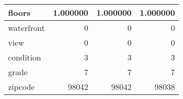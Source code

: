 \begin{table}[H]
\begin{tabular}{|l|r|r|r|}
\hline floors & \cellcolor[rgb]{0.9, 0.54, 0.52} 1.000000 & \cellcolor[rgb]{0.9, 0.54, 0.52} 1.000000 & \cellcolor[rgb]{0.9, 0.54, 0.52} 1.000000 \\
\hline waterfront & \cellcolor[rgb]{0.9, 0.54, 0.52} 0 & \cellcolor[rgb]{0.9, 0.54, 0.52} 0 & \cellcolor[rgb]{0.9, 0.54, 0.52} 0 \\
\hline view & \cellcolor[rgb]{0.9, 0.54, 0.52} 0 & \cellcolor[rgb]{0.9, 0.54, 0.52} 0 & \cellcolor[rgb]{0.9, 0.54, 0.52} 0 \\
\hline condition & \cellcolor[rgb]{0.9, 0.54, 0.52} 3 & \cellcolor[rgb]{0.9, 0.54, 0.52} 3 & \cellcolor[rgb]{0.9, 0.54, 0.52} 3 \\
\hline grade & \cellcolor[rgb]{0.9, 0.54, 0.52} 7 & \cellcolor[rgb]{0.9, 0.54, 0.52} 7 & \cellcolor[rgb]{0.9, 0.54, 0.52} 7 \\
\hline zipcode & \cellcolor[rgb]{0.9, 0.54, 0.52} 98042 & \cellcolor[rgb]{0.9, 0.54, 0.52} 98042 & 98038 \\
\hline
\end{tabular}
\end{table}
